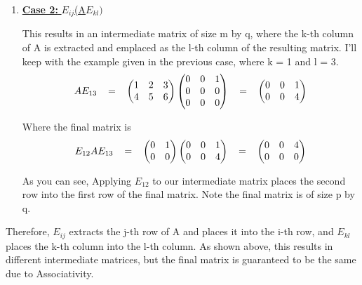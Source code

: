\documentclass[12pt]{article}
\newcommand{\hop}{\vspace{1mm}}
\begin{document}
\begin{enumerate}[leftmargin=\labelsep]
\begin{enumerate}
\begin{enumerate}
    \hop
    \item \underline{\textbf{Case 2:} $E_{ij}$(A$E_{kl})$}
    
    \hop
    This results in an intermediate matrix of size m by q, where the k-th column of A is extracted and emplaced as the l-th column of the resulting matrix. I'll keep with the example given in the previous case, where k = 1 and l = 3.
    \[
    AE_{13}
    \hspace{3mm}
    =
    \hspace{3mm}
    \begin{pmatrix}
        1   &2  &3  \\
        4   &5  &6
    \end{pmatrix}
    \begin{pmatrix}
        0   &0  &1  \\
        0   &0  &0  \\
        0   &0  &0
    \end{pmatrix}
    \hspace{3mm}
    =
    \hspace{3mm}
    \begin{pmatrix}
        0   &0  &1  \\
        0   &0  &4
    \end{pmatrix}
    \]

    \hop
    Where the final matrix is 
    \[
    E_{12}AE_{13}
    \hspace{3mm}
    =
    \hspace{3mm}
    \begin{pmatrix}
        0   &1  \\
        0   &0
    \end{pmatrix}
    \begin{pmatrix}
        0   &0  &1  \\
        0   &0  &4
    \end{pmatrix}
    \hspace{3mm}
    =
    \hspace{3mm}
    \begin{pmatrix}
        0   &0  &4  \\
        0   &0  &0
    \end{pmatrix}
    \]

    \hop
    As you can see, Applying $E_{12}$ to our intermediate matrix places the second row into the first row of the final matrix. Note the final matrix is of size p by q.
\end{enumerate}

\hop
Therefore, $E_{ij}$ extracts the j-th row of A and places it into the i-th row, and $E_{kl}$ places the k-th column into the l-th column. As shown above, this results in different intermediate matrices, but the final matrix is guaranteed to be the same due to Associativity.


\end{enumerate}
\end{enumerate}
\end{document}
